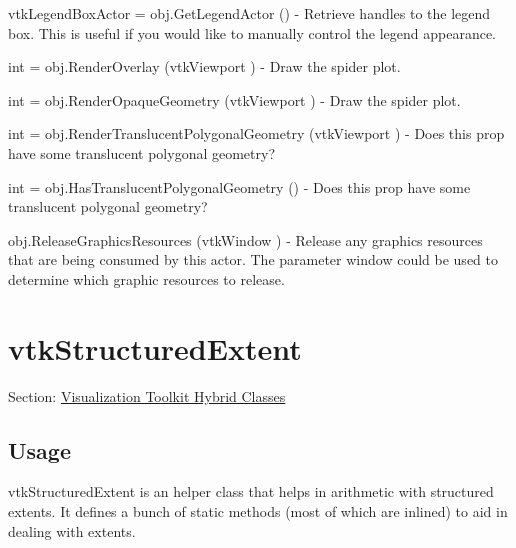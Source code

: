 \begin{DoxyItemize}
\item {\ttfamily vtk\-Legend\-Box\-Actor = obj.\-Get\-Legend\-Actor ()} -\/ Retrieve handles to the legend box. This is useful if you would like to manually control the legend appearance.  
\item {\ttfamily int = obj.\-Render\-Overlay (vtk\-Viewport )} -\/ Draw the spider plot.  
\item {\ttfamily int = obj.\-Render\-Opaque\-Geometry (vtk\-Viewport )} -\/ Draw the spider plot.  
\item {\ttfamily int = obj.\-Render\-Translucent\-Polygonal\-Geometry (vtk\-Viewport )} -\/ Does this prop have some translucent polygonal geometry?  
\item {\ttfamily int = obj.\-Has\-Translucent\-Polygonal\-Geometry ()} -\/ Does this prop have some translucent polygonal geometry?  
\item {\ttfamily obj.\-Release\-Graphics\-Resources (vtk\-Window )} -\/ Release any graphics resources that are being consumed by this actor. The parameter window could be used to determine which graphic resources to release.  
\end{DoxyItemize}\hypertarget{vtkhybrid_vtkstructuredextent}{}\section{vtk\-Structured\-Extent}\label{vtkhybrid_vtkstructuredextent}
Section\-: \hyperlink{sec_vtkhybrid}{Visualization Toolkit Hybrid Classes} \hypertarget{vtkwidgets_vtkxyplotwidget_Usage}{}\subsection{Usage}\label{vtkwidgets_vtkxyplotwidget_Usage}
vtk\-Structured\-Extent is an helper class that helps in arithmetic with structured extents. It defines a bunch of static methods (most of which are inlined) to aid in dealing with extents.

